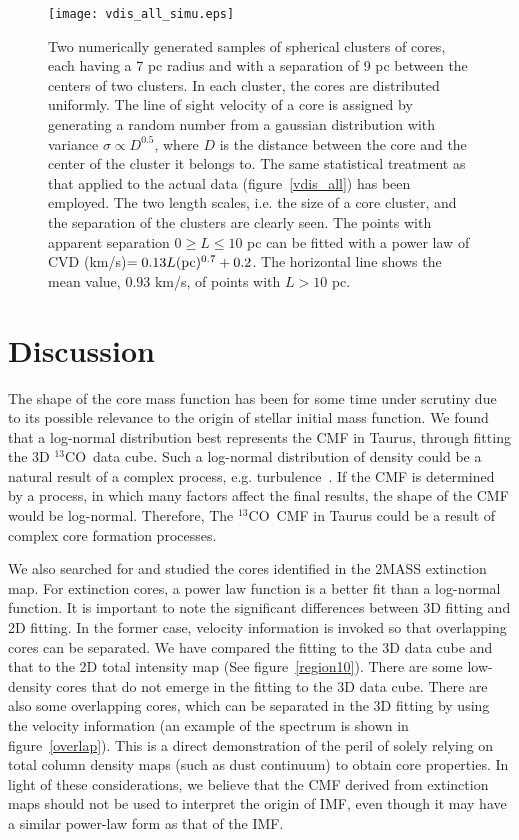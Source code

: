\documentclass[12pt,preprint]{aastex}
\def\13co{$^{13}$CO}
\begin{document}
\begin{figure}[htb]
\centering
\texttt{[image: vdis\_all\_simu.eps]}
\caption{ Two numerically generated samples of spherical clusters of cores, each having a 7 pc radius and with a separation of 9 pc between the centers of two clusters.
In each cluster, the cores are distributed uniformly. The line of sight velocity of a core is assigned by generating a random number from a gaussian
distribution with variance $\sigma \propto D^{0.5}$, where $D$ is the distance between
the core and the center of the cluster it belongs to.
The same statistical treatment as that applied to the actual data (figure~\ref{vdis_all}) has been employed. The two length scales, i.e. the size of a core cluster,
and the separation of the clusters are clearly seen. The points with apparent separation $ 0 \geq L \leq 10$  pc can
be fitted with a power law of CVD (km/s)$=0.13L ({\rm pc})^{0.7}+0.2$.
The horizontal line shows the mean value, $0.93$ km/s, of points with $L> 10$ pc.
\label{vdis_all_simu}}
\end{figure}


\section{Discussion}
\label{sec:discussion}
The shape of the core mass function has been for some time under scrutiny due to its possible relevance to the origin of
stellar initial mass function. We found that a log-normal distribution best represents the CMF in Taurus, through fitting the 3D \13co\ data cube. Such a log-normal distribution of density could be a natural result of a complex process, e.g. turbulence~\citep{Tassis2010}. If the CMF is determined by  a process, in which many factors affect the final results,
the shape of the CMF would be log-normal. Therefore, The \13co\ CMF in Taurus could be a result of complex
core formation processes.

We also searched for and studied the cores identified in the 2MASS extinction map.
For extinction cores, a power law function is a better
fit than a log-normal function. It is important to note the significant differences between 3D fitting and 2D fitting. In the former case, velocity
information is invoked so that overlapping cores can be separated. We have compared the fitting to the 3D data cube and
that to the 2D total intensity map (See figure~\ref{region10}). There are some
low-density cores that do not emerge in the fitting to the 3D data cube. There are also some overlapping cores, which can be separated in
the 3D fitting by using the velocity information (an example of the spectrum is shown in figure~\ref{overlap}).
This is a direct demonstration of the peril of solely relying on total column density maps (such as dust continuum) to obtain core properties.  In light of these considerations, we believe that  the CMF derived from  extinction maps should not be used to interpret the origin of IMF, even though it may have a similar power-law form as that of the IMF.
\end{document}
